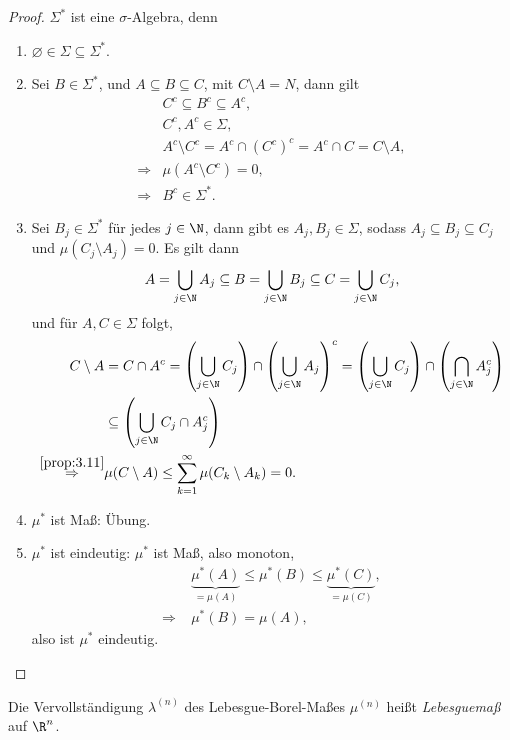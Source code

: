 \begin{proof}
$\Sigma^*$ ist eine $\sigma$-Algebra, denn
\begin{enumerate}[label=\arabic{*}.)]
  \item $\varnothing\in\Sigma\subseteq\Sigma^*$.
  \item Sei $B\in\Sigma^*$, und $A\subseteq B\subseteq C$, mit $C\setminus
  A = N$, dann gilt
  \begin{align*}
  &C^c \subseteq B^c \subseteq A^c,\\
  &C^c, A^c \in \Sigma,\\
  &A^c \setminus C^c = A^c \cap (C^c)^c = A^c \cap C = C\setminus A,\\
  \Rightarrow &\mu(A^c\setminus C^c) = 0,\\
  \Rightarrow &B^c\in \Sigma^*.
  \end{align*}
  \item Sei 
  $B_j\in\Sigma^*$ für jedes $j\in\N$, dann gibt es $A_j,B_j\in \Sigma$, sodass
  $A_j\subseteq B_j\subseteq C_j$ und $\mu(C_j\setminus A_j) = 0$. Es gilt dann
  \begin{align*}
  A = \bigcup_{j\in\N} A_j \subseteq B = \bigcup_{j\in\N} B_j  \subseteq C =
  \bigcup_{j\in\N} C_j,
  \end{align*}
  und für $A,C\in\Sigma$ folgt,
  \begin{align*}
  C\setminus A &= C\cap A^c = \left( \bigcup_{j\in\N} C_j \right) \cap
  \left(\bigcup_{j\in\N} A_j\right)^c =
  \left( \bigcup_{j\in\N} C_j \right) \cap
  \left(\bigcap_{j\in\N} A_j^c\right) \\ &
  \subseteq   \left( \bigcup_{j\in\N} C_j \cap A_j^c \right)\\
  \overset{\ref{prop:3.11}}{\Rightarrow} &\mu(C\setminus A) \le
  \sum\limits_{k=1}^\infty \mu(C_k\setminus A_k) = 0.
  \end{align*}
\item $\mu^*$ ist Maß: Übung.
\item $\mu^*$ ist eindeutig: $\mu^*$ ist Maß, also monoton,
\begin{align*}
&\underbrace{\mu^*(A)}_{=\mu(A)} \le \mu^*(B) \le
\underbrace{\mu^*(C)}_{=\mu(C)},\\
\Rightarrow\; & \mu^*(B) = \mu(A), 
\end{align*}
also ist $\mu^*$ eindeutig.\qedhere
\end{enumerate}
\end{proof}

\begin{defn}
\label{defn:3.14} Die Vervollständigung $\lambda^{(n)}$ des
Lebesgue-Borel-Maßes $\mu^{(n)}$ heißt \emph{Lebesguemaß} auf $\R^n$.\fishhere
\end{defn}

